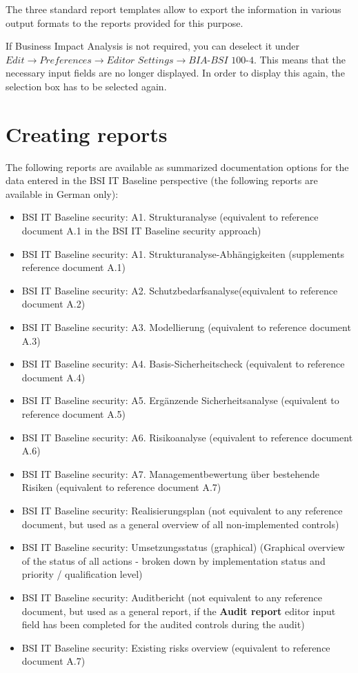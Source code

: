 \documentclass[a4paper,10pt]{book}
\begin{document}
The three standard report templates allow to export the information in various
output formats to the reports provided for this purpose.

If Business Impact Analysis is not required, you can deselect it under
$\textit{Edit}\to\textit{Preferences}\to\textit{Editor
Settings}\to\textit{BIA-BSI 100-4}$. This means that the necessary input fields
are no longer displayed. In order to display this again, the selection box has
to be selected again.


\section{Creating reports}
\label{sec:bsi-creating-reports}

 The following reports are available as summarized documentation options for the data entered in the
 BSI IT Baseline perspective (the following reports are available in German only):
 \begin{itemize}
 \item BSI IT Baseline security: A1. Strukturanalyse (equivalent to reference document A.1 in the BSI IT Baseline security approach)
 \item BSI IT Baseline security: A1. Strukturanalyse-Abhängigkeiten (supplements reference document A.1)
 \item BSI IT Baseline security: A2. Schutzbedarfsanalyse(equivalent to reference document A.2)
 \item BSI IT Baseline security: A3. Modellierung (equivalent to reference document A.3)
 \item BSI IT Baseline security: A4. Basis-Sicherheitscheck (equivalent to reference document A.4)
 \item BSI IT Baseline security: A5. Ergänzende Sicherheitsanalyse (equivalent to reference document A.5)
 \item BSI IT Baseline security: A6. Risikoanalyse (equivalent to reference document A.6)
 \item BSI IT Baseline security: A7. Managementbewertung über bestehende Risiken (equivalent to reference document A.7)
 \item BSI IT Baseline security: Realisierungsplan (not equivalent to any reference document, but used as a general overview of all non-implemented controls)
 \item BSI IT Baseline security: Umsetzungsstatus (graphical) (Graphical overview of the status of all actions - broken down by implementation status and priority / qualification level)
 \item BSI IT Baseline security: Auditbericht (not equivalent to any reference document, but used as a general report, if the \textbf{Audit report} editor input field has been completed for the audited controls during the audit)
 \item BSI IT Baseline security: Existing risks overview (equivalent to reference document A.7)
 \end{itemize}
\end{document}
